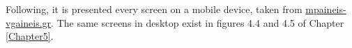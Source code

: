 Following, it is presented every screen on a mobile device, taken from \url{mpaineis-vgaineis.gr}. The same screens in desktop exist in figures 4.4 and 4.5 of Chapter \ref{Chapter5}.
\begin{figure}[H]
	\centering
	\qquad

\end{figure}
